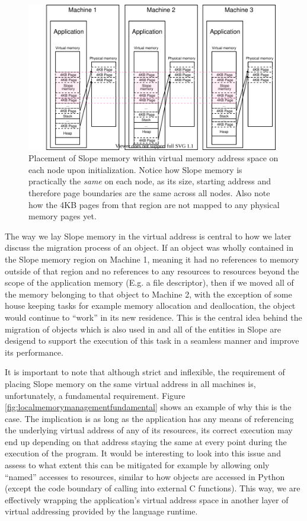 \begin{figure}
\centering
{}
\includegraphics[width=1\textwidth]{local-memory-management-phys-log.drawio}
\caption{
    Placement of Slope memory within virtual memory address space on each node
    upon initialization.
    Notice how Slope memory is practically the \emph{same} on each node, as
    its size, starting address and therefore page boundaries are the same
    across all nodes. Also note how
    the 4KB pages from that region are not mapped to any physical memory pages
    yet.
}
\label{fig:localmemorymanagementphyslog}
\end{figure}

The way we lay Slope memory in the virtual address is central to how we later
discuss the migration process of an object. If an object was wholly contained
in the Slope memory region on Machine 1, meaning it had no references to memory
outside
of that region and no references to any resources to resources beyond the
scope of the application memory (E.g. a file descriptor), then if we moved all
of the memory belonging to that object to Machine 2, with the exception of
some house keeping tasks for example memory allocation and deallocation, the
object would continue to ``work'' in its new residence. This is the central
idea behind the migration of objects which is also used in \cite{memon2018ramp}
and all of the entities in Slope are desigend
to support the execution of this task in a seamless manner and improve its
performance.

It is important to note that although strict and inflexible, the requirement of
placing Slope memory on the same virtual address in all machines is,
unfortunately, a fundamental requirement. Figure \ref{fig:localmemorymanagementfundamental}
shows an example of why this is the case. The implication is as long as the
application has any means of referencing the underlying virtual address of any
of its resources, its correct execution may end up depending on that address
staying the same at every point during the execution of the program. It would
be interesting to look into this issue and assess to what extent this can be
mitigated for example by allowing only ``named'' accesses to resources, similar
to how objects are accessed in Python (except the code boundary of calling into
external C functions). This way, we are effectively wrapping the application's
virtual address space in another layer of virtual addressing provided by the
language runtime.


